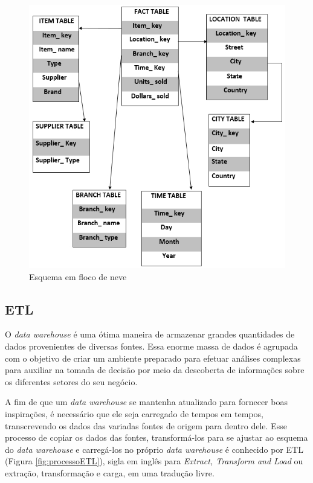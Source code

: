 \begin{figure}[ht]
\centering
\includegraphics[width=.8\textwidth]{imagens/example-snowflake-schema.jpg}
\caption{Esquema em floco de neve}
\author{Fonte: https://www.educba.com/star-schema-vs-snowflake-schema/}
\label{fig:esquemaFlocoNeve}
\end{figure}

\subsection{ETL}
\label{subsec:etl}
O \textit{data warehouse} é uma ótima maneira de armazenar grandes quantidades de dados provenientes de diversas fontes. Essa enorme massa de dados é agrupada com o objetivo de criar um ambiente preparado para efetuar análises complexas para auxiliar na tomada de decisão por meio da descoberta de informações sobre os diferentes setores do seu negócio.

A fim de que um \textit{data warehouse} se mantenha atualizado para fornecer boas inspirações, é necessário que ele seja carregado de tempos em tempos, transcrevendo os dados das variadas fontes de origem para dentro dele. Esse processo de copiar os dados das fontes, transformá-los para se ajustar ao esquema do \textit{data warehouse} e carregá-los no próprio \textit{data warehouse} é conhecido por ETL (Figura \ref{fig:processoETL}), sigla em inglês para \textit{Extract, Transform and Load} ou extração, transformação e carga, em uma tradução livre.

